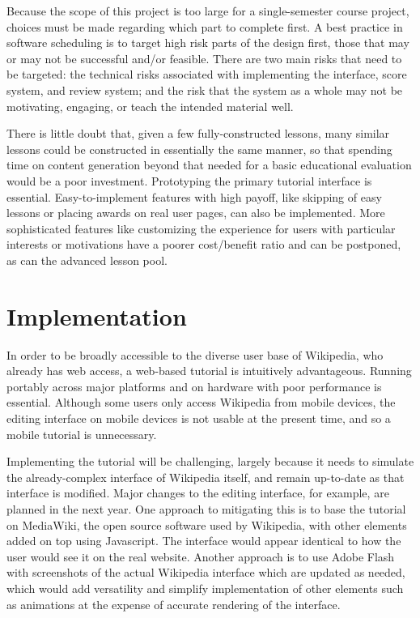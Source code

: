 \documentclass{acm_proc_article-sp}
\begin{document}
Because the scope of this project is too large for a single-semester course project, choices must be made regarding which part to complete first. A best practice in software scheduling is to target high risk parts of the design first, those that may or may not be successful and/or feasible.\cite{Boehm:1988} There are two main risks that need to be targeted: the technical risks associated with implementing the interface, score system, and review system; and the risk that the system as a whole may not be motivating, engaging, or teach the intended material well.

There is little doubt that, given a few fully-constructed lessons, many similar lessons could be constructed in essentially the same manner, so that spending time on content generation beyond that needed for a basic educational evaluation would be a poor investment. Prototyping the primary tutorial interface is essential. Easy-to-implement features with high payoff, like skipping of easy lessons or placing awards on real user pages, can also be implemented. More sophisticated features like customizing the experience for users with particular interests or motivations have a poorer cost/benefit ratio and can be postponed, as can the advanced lesson pool.

\section{Implementation}
In order to be broadly accessible to the diverse user base of Wikipedia, who already has web access, a web-based tutorial is intuitively advantageous. Running portably across major platforms and on hardware with poor performance is essential. Although some users only access Wikipedia from mobile devices, the editing interface on mobile devices is not usable at the present time, and so a mobile tutorial is unnecessary.

Implementing the tutorial will be challenging, largely because it needs to simulate the already-complex interface of Wikipedia itself, and remain up-to-date as that interface is modified. Major changes to the editing interface, for example,  are planned in the next year. One approach to mitigating this is to base the tutorial on MediaWiki, the open source software used by Wikipedia, with other elements added on top using Javascript. The interface would appear identical to how the user would see it on the real website. Another approach is to use Adobe Flash with screenshots of the actual Wikipedia interface which are updated as needed, which would add versatility and simplify implementation of other elements such as animations at the expense of accurate rendering of the interface.
\end{document}
